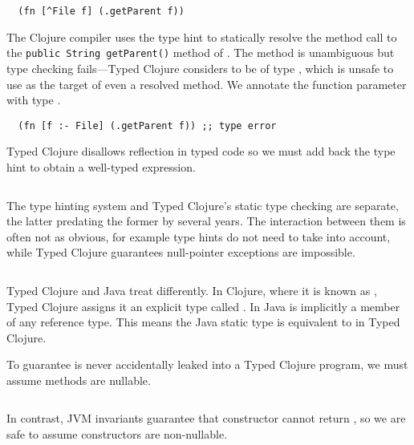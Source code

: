 \begin{verbatim}
  (fn [^File f] (.getParent f))
\end{verbatim}

The Clojure compiler uses the type hint
to statically resolve 
the method call to the
\texttt{public String getParent()}
method of .
The method is unambiguous but type checking fails---Typed Clojure
considers  to be of type , which is unsafe 
to use as the target of even a resolved method.
We annotate the function parameter with type .

\begin{verbatim}
  (fn [f :- File] (.getParent f)) ;; type error
\end{verbatim}

Typed Clojure disallows reflection in typed code
so we must add back the type hint to obtain a well-typed
expression.

\begin{exmp}
\inputminted[firstline=10,lastline=10]{clojure}{code/demo/src/demo/parent3.clj}
\end{exmp}

The type hinting system and Typed Clojure's static type checking
are separate, the latter predating the former by several years.
The interaction between them is often not as obvious, for example type hints
do not need to take  into account, while Typed Clojure guarantees
null-pointer exceptions are impossible.

\begin{exmp}
\inputminted[firstline=18,lastline=19]{clojure}{code/demo/src/demo/parent3.clj}
\end{exmp}

Typed Clojure and Java treat  differently.
In Clojure, where it is known as , Typed Clojure assigns it an explicit type
called . In Java  is implicitly a member of any reference type.
This means the Java static type  is equivalent to
 in Typed Clojure.

To guarantee  is never accidentally leaked into a Typed Clojure program,
we must assume methods are nullable.

\begin{exmp}
\inputminted[firstline=6,lastline=8]{clojure}{code/demo/src/demo/parent3.clj}
\end{exmp}

In contrast, JVM invariants guarantee that  constructor cannot return ,
so we are safe to assume constructors are non-nullable.

